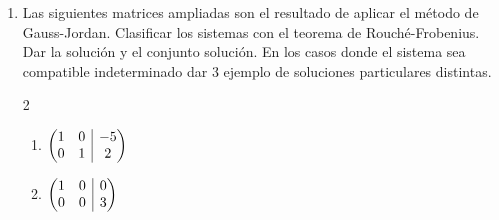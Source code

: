 \documentclass[a4paper]{article}
\makeatletter
\newcommand{\exercise}{\item}
\newenvironment{amatrix}[1]{%
  \left(\begin{array}{@{}*{#1}{c}|c@{}}
}{%
  \end{array}\right)
}
\makeatother
\begin{document}
\begin{enumerate}
\begin{multicols}{2}
\begin{enumerate} [label=(\alph*)]
		\item $\left\{\begin{matrix} 2a+2b+3c=0 \\ 2a+5b+c=0 \end{matrix}\right.$
		\item $\left\{\begin{matrix} 3x+2y+z-w=3 \\ x+y-2z-3w=5 \\ 7x+8y +7z +3w=2 \end{matrix}\right.$
		\item $\left\{\begin{matrix} 3T+P=2 \\ 6T-P=1 \\ 2T+2P=3 \end{matrix}\right.$
		\item $\left\{\begin{matrix} x+2y=6 \\ 2x+y=6 \\ 3x+4y=14 \end{matrix}\right.$
		\item $\left\{\begin{matrix} 2x-y+15z=3 \\ x-3y-2z=7 \\ x-8y-21z=11 \end{matrix}\right.$
		\item $\left\{\begin{matrix} 2x-2y+14z-2w=0 \\ 4x-6y-16z+2w=0 \end{matrix}\right.$
	\end{enumerate}
	\end{multicols}
	\exercise Las siguientes matrices ampliadas son el resultado de aplicar el método de Gauss-Jordan. Clasificar los sistemas con el teorema de Rouché-Frobenius. Dar la solución y el conjunto solución. En los casos donde el sistema sea compatible indeterminado dar 3 ejemplo de soluciones particulares distintas.
	\begin{multicols}{2}
	\begin{enumerate} [label=(\alph*)]
		\item $\begin{amatrix}{2} 1 & 0 & -5 \\ 0 & 1 & 2 \end{amatrix}$
		\item $\begin{amatrix}{2} 1 & 0 & 0 \\ 0 & 0 & 3 \end{amatrix}$

\end{enumerate}
\end{multicols}
\end{enumerate}
\end{document}
